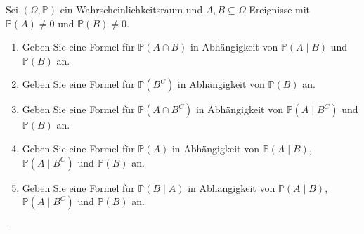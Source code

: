 \documentclass{article}
\begin{document}
\begin{problem}
Sei $(\Omega, \mathbb{P})$ ein Wahrscheinlichkeitsraum und $A, B \subseteq \Omega$ Ereignisse mit $\mathbb{P}(A) \neq 0$ und $\mathbb{P}(B) \neq 0$.
\begin{enumerate}
\item {
Geben Sie eine Formel für $\mathbb{P}(A \cap B)$ in Abhängigkeit von $\mathbb{P}(A \mid B)$ und $\mathbb{P}(B)$ an.
}
\item {
Geben Sie eine Formel für $\mathbb{P}(B^C)$ in Abhängigkeit von $\mathbb{P}(B)$ an.
}
\item {
Geben Sie eine Formel für $\mathbb{P}(A \cap B^C)$ in Abhängigkeit von $\mathbb{P}(A \mid B^C)$ und $\mathbb{P}(B)$ an.
}
\item {
Geben Sie eine Formel für $\mathbb{P}(A)$ in Abhängigkeit von $\mathbb{P}(A \mid B)$, $\mathbb{P}(A \mid B^C)$ und $\mathbb{P}(B)$ an.
}
\item {
Geben Sie eine Formel für $\mathbb{P}(B \mid A)$ in Abhängigkeit von $\mathbb{P}(A \mid B)$, $\mathbb{P}(A \mid B^C)$ und $\mathbb{P}(B)$ an.
}
\end{enumerate}
\end{problem}

\begin{solution}
-
\end{solution}
\end{document}
